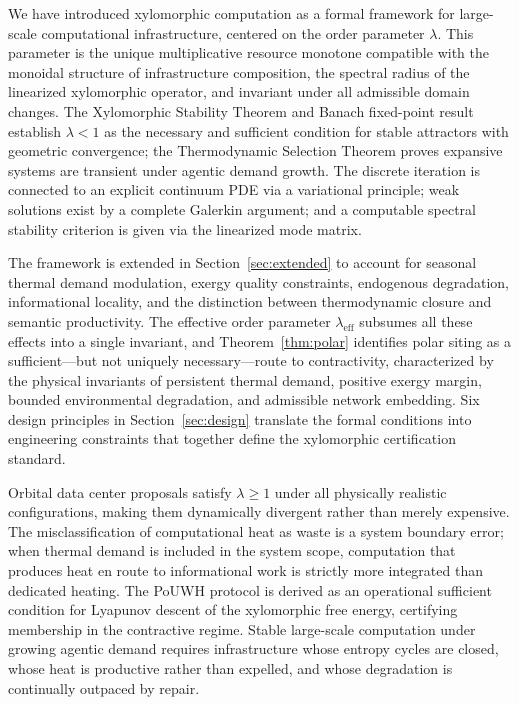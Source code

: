 \documentclass[10pt,twocolumn]{article}
\theoremstyle{plain}
\theoremstyle{definition}
\theoremstyle{remark}
\begin{document}
We have introduced xylomorphic computation as a formal framework for
large-scale computational infrastructure, centered on the order
parameter $\lambda$. This parameter is the unique multiplicative
resource monotone compatible with the monoidal structure of
infrastructure composition, the spectral radius of the linearized
xylomorphic operator, and invariant under all admissible domain
changes. The Xylomorphic Stability Theorem and Banach fixed-point
result establish $\lambda < 1$ as the necessary and sufficient
condition for stable attractors with geometric convergence; the
Thermodynamic Selection Theorem proves expansive systems are
transient under agentic demand growth. The discrete iteration is
connected to an explicit continuum PDE via a variational principle;
weak solutions exist by a complete Galerkin argument; and a
computable spectral stability criterion is given via the linearized
mode matrix.

The framework is extended in Section~\ref{sec:extended} to account
for seasonal thermal demand modulation, exergy quality constraints,
endogenous degradation, informational locality, and the distinction
between thermodynamic closure and semantic productivity. The effective
order parameter $\lambda_{\mathrm{eff}}$ subsumes all these effects
into a single invariant, and Theorem~\ref{thm:polar} identifies polar
siting as a sufficient---but not uniquely necessary---route to
contractivity, characterized by the physical invariants of persistent
thermal demand, positive exergy margin, bounded environmental
degradation, and admissible network embedding. Six design principles
in Section~\ref{sec:design} translate the formal conditions into
engineering constraints that together define the xylomorphic
certification standard.

Orbital data center proposals satisfy $\lambda \geq 1$ under all
physically realistic configurations, making them dynamically
divergent rather than merely expensive. The misclassification of
computational heat as waste is a system boundary error; when thermal
demand is included in the system scope, computation that produces
heat en route to informational work is strictly more integrated than
dedicated heating. The PoUWH protocol is derived as an operational
sufficient condition for Lyapunov descent of the xylomorphic free
energy, certifying membership in the contractive regime. Stable
large-scale computation under growing agentic demand requires
infrastructure whose entropy cycles are closed, whose heat is
productive rather than expelled, and whose degradation is continually
outpaced by repair.
\end{document}
